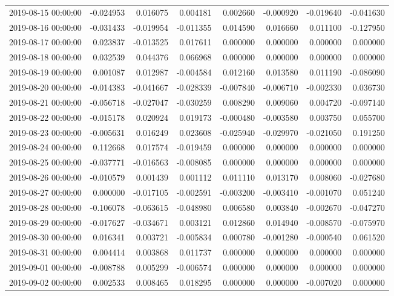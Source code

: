 \begin{tabular}{lrrrrrrr}
2019-08-15 00:00:00 & -0.024953 & 0.016075 & 0.004181 & 0.002660 & -0.000920 & -0.019640 & -0.041630 \\
2019-08-16 00:00:00 & -0.031433 & -0.019954 & -0.011355 & 0.014590 & 0.016660 & 0.011100 & -0.127950 \\
2019-08-17 00:00:00 & 0.023837 & -0.013525 & 0.017611 & 0.000000 & 0.000000 & 0.000000 & 0.000000 \\
2019-08-18 00:00:00 & 0.032539 & 0.044376 & 0.066968 & 0.000000 & 0.000000 & 0.000000 & 0.000000 \\
2019-08-19 00:00:00 & 0.001087 & 0.012987 & -0.004584 & 0.012160 & 0.013580 & 0.011190 & -0.086090 \\
2019-08-20 00:00:00 & -0.014383 & -0.041667 & -0.028339 & -0.007840 & -0.006710 & -0.002330 & 0.036730 \\
2019-08-21 00:00:00 & -0.056718 & -0.027047 & -0.030259 & 0.008290 & 0.009060 & 0.004720 & -0.097140 \\
2019-08-22 00:00:00 & -0.015178 & 0.020924 & 0.019173 & -0.000480 & -0.003580 & 0.003750 & 0.055700 \\
2019-08-23 00:00:00 & -0.005631 & 0.016249 & 0.023608 & -0.025940 & -0.029970 & -0.021050 & 0.191250 \\
2019-08-24 00:00:00 & 0.112668 & 0.017574 & -0.019459 & 0.000000 & 0.000000 & 0.000000 & 0.000000 \\
2019-08-25 00:00:00 & -0.037771 & -0.016563 & -0.008085 & 0.000000 & 0.000000 & 0.000000 & 0.000000 \\
2019-08-26 00:00:00 & -0.010579 & 0.001439 & 0.001112 & 0.011110 & 0.013170 & 0.008060 & -0.027680 \\
2019-08-27 00:00:00 & 0.000000 & -0.017105 & -0.002591 & -0.003200 & -0.003410 & -0.001070 & 0.051240 \\
2019-08-28 00:00:00 & -0.106078 & -0.063615 & -0.048980 & 0.006580 & 0.003840 & -0.002670 & -0.047270 \\
2019-08-29 00:00:00 & -0.017627 & -0.034671 & 0.003121 & 0.012860 & 0.014940 & -0.008570 & -0.075970 \\
2019-08-30 00:00:00 & 0.016341 & 0.003721 & -0.005834 & 0.000780 & -0.001280 & -0.000540 & 0.061520 \\
2019-08-31 00:00:00 & 0.004414 & 0.003868 & 0.011737 & 0.000000 & 0.000000 & 0.000000 & 0.000000 \\
2019-09-01 00:00:00 & -0.008788 & 0.005299 & -0.006574 & 0.000000 & 0.000000 & 0.000000 & 0.000000 \\
2019-09-02 00:00:00 & 0.002533 & 0.008465 & 0.018295 & 0.000000 & 0.000000 & -0.007020 & 0.000000 \\

\end{tabular}
